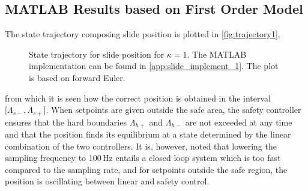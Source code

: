 \subsection{MATLAB Results based on First Order Model}\label{subsec:matlab-results-1order}
\vspace{-1mm}
The state trajectory composing slide position is plotted in \autoref{fig:trajectory1},
\begin{figure}[htbp]
\hspace*{-5mm}\vspace*{-1mm}
%
%
\caption{State trajectory for slide position for $\kappa=1$. The MATLAB implementation can be found in \autoref{app:slide_implement_1}. The plot is based on forward Euler.}
\label{fig:trajectory1}
\end{figure}
%
%
from which it is seen how the correct position is obtained in the interval $[\Lambda_{s-},\Lambda_{s+}$]. When setpoints are given outside the safe area, the safety controller ensures that the hard boundaries $\Lambda_{h+}$ and $\Lambda_{h-}$ are not exceeded at any time and that the position finds its equilibrium at a state determined by the linear combination of the two controllers. It is, however, noted that lowering the sampling frequency to 100\,Hz entails a closed loop system which is too fast compared to the sampling rate, and for setpoints outside the safe region, the position is oscillating between linear and safety control.

